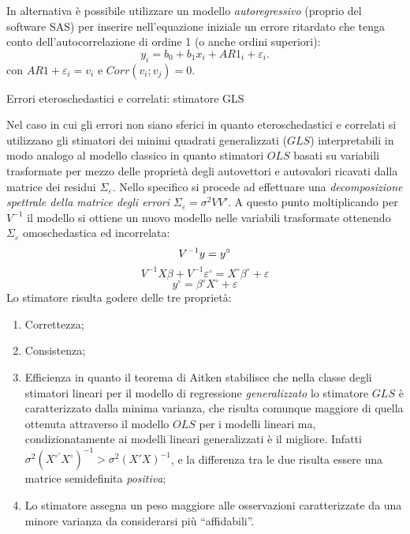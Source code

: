 \documentclass[a4page, 11pt]{article} %
\begin{document}
In alternativa è possibile utilizzare un modello \textit{autoregressivo} (proprio del software SAS) per inserire nell’equazione iniziale un errore ritardato che tenga conto dell’autocorrelazione di ordine 1 (o anche ordini superiori): 
\begin{equation*}
y_i=b_0 +b_1 x_i +AR1_i  + \varepsilon_i. 
\end{equation*}
con $AR1 + \varepsilon_i = v_i$ e $Corr(v_i;v_j) = 0$.
\newline
\begin{itshape}
Errori eteroschedastici e correlati: stimatore GLS
\end{itshape}

Nel caso in cui gli errori non siano sferici in quanto eteroschedastici e correlati si utilizzano gli stimatori dei minimi quadrati generalizzati ($GLS$) interpretabili in modo analogo al modello classico in quanto stimatori $OLS$ basati su variabili trasformate per mezzo delle proprietà degli autovettori e autovalori ricavati dalla matrice dei residui $\Sigma_\varepsilon$.
Nello specifico si procede ad effettuare una \textit{decomposizione spettrale della matrice degli errori} $\Sigma_\varepsilon = \sigma^2 VV'$. A questo punto moltiplicando per $V^{-1}$ il modello si ottiene un nuovo modello nelle variabili trasformate ottenendo $\Sigma_\varepsilon$ omoschedastica ed incorrelata:
\begin{equation*}
V^{-1}y = y^\circ \\
\end{equation*}
\begin{equation*}
V^{-1}X\beta + V^{-1}\varepsilon^\circ = X^\circ\beta^\circ + \varepsilon
\end{equation*}
\begin{equation*}
y^\circ = \beta^\circ X^\circ + \varepsilon
\end{equation*}
Lo stimatore risulta godere delle tre proprietà:
\begin{enumerate}[noitemsep]
\item Correttezza;
\item Consistenza;
\item Efficienza in quanto il teorema di Aitken stabilisce che nella classe degli stimatori lineari per il modello di regressione \textit{generalizzato} lo stimatore $GLS$ è caratterizzato dalla minima varianza, che risulta comunque maggiore di quella ottenuta attraverso il modello $OLS$ per i modelli lineari ma, condizionatamente ai modelli lineari generalizzati è il migliore. Infatti $\sigma^2 (X^{\circ '}X^{\circ})^{-1} >\sigma^2 (X'X)^{-1}$, e la differenza tra le due risulta essere una matrice semidefinita \textit{positiva};
\item Lo stimatore assegna un peso maggiore alle osservazioni caratterizzate da una minore varianza da considerarsi più ``affidabili''.
\end{enumerate}
\end{document}
